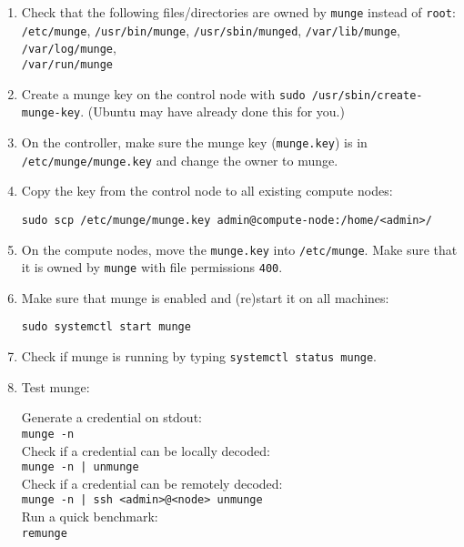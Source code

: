 \begin{enumerate}
\begin{enumerate}
        \item Check that the following files/directories are owned by \texttt{munge} instead of \texttt{root}: \\
        \texttt{/etc/munge}, 
        \texttt{/usr/bin/munge}, 
        \texttt{/usr/sbin/munged}, 
        \texttt{/var/lib/munge}, 
        \texttt{/var/log/munge}, \\
        \texttt{/var/run/munge}

      \item Create a munge key on the control node with \texttt{sudo /usr/sbin/create-munge-key}. (Ubuntu may have already done this for you.) 

      \item On the controller, make sure the munge key (\texttt{munge.key}) is in \texttt{/etc/munge/munge.key} and change the owner to munge.  

      \item Copy the key from the control node to all existing compute nodes: 

        \texttt{sudo scp /etc/munge/munge.key admin@compute-node:/home/<admin>/}

      \item On the compute nodes, move the \texttt{munge.key} into \texttt{/etc/munge}. Make sure that it is owned by \texttt{munge} with file permissions \texttt{400}.

      \item Make sure that munge is enabled and (re)start it on all machines:

        \texttt{sudo systemctl start munge}

      \item Check if munge is running by typing \texttt{systemctl status munge}.

      \item Test munge: 

        Generate a credential on stdout: \\
        \texttt{munge -n} \\
        Check if a credential can be locally decoded: \\
        \texttt{munge -n | unmunge} \\
        Check if a credential can be remotely decoded: \\
        \texttt{munge -n | ssh <admin>@<node> unmunge} \\
        Run a quick benchmark: \\
        \texttt{remunge}
    \end{enumerate}


\end{enumerate}
